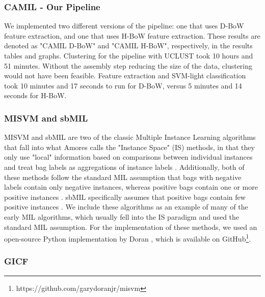 
\subsubsection{CAMIL - Our Pipeline}

We implemented two different versions of the pipeline: one that uses D-BoW feature extraction, and one that uses H-BoW feature extraction. These results are denoted as "CAMIL D-BoW" and "CAMIL H-BoW", respectively, in the results tables and graphs. Clustering for the pipeline with UCLUST took 10 hours and 51 minutes. Without the assembly step reducing the size of the data, clustering would not have been feasible. Feature extraction and SVM-light classification took 10 minutes and 17 seconds to run for D-BoW, versus 5 minutes and 14 seconds for H-BoW.

\subsubsection{MISVM and sbMIL}

MISVM \cite{andrews02} and sbMIL \cite{bunescu07} are two of the classic Multiple Instance Learning algorithms that fall into what Amores calls the "Instance Space" (IS) methods, in that they only use "local" information based on comparisons between individual instances and treat bag labels as aggregations of instance labels \cite{amores13}. Additionally, both of these methods follow the standard MIL assumption that bags with negative labels contain only negative instances, whereas positive bags contain one or more positive instances \cite{amores13}. sbMIL specifically assumes that positive bags contain few positive instances \cite{bunescu07}. We include these algorithms as an example of many of the early MIL algorithms, which usually fell into the IS paradigm and used the standard MIL assumption. For the implementation of these methods, we used an open-source Python implementation by Doran \cite{doran14}, which is available on GitHub\footnote{https://github.com/garydoranjr/misvm}.

\subsubsection{GICF}

